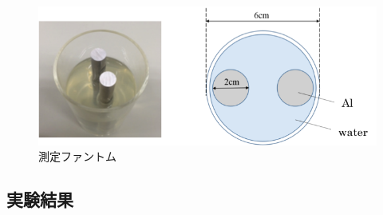 \begin{figure}[H]
 \begin{center}
 \includegraphics[bb=0.000000 0.000000 324.453179 132.949010,width=0.7\hsize]{image2/chapter5/Al_Al.png} 
 \end{center}
 \caption{測定ファントム}
 \label{fig:Al_Al}
\end{figure}

\subsection{実験結果}

